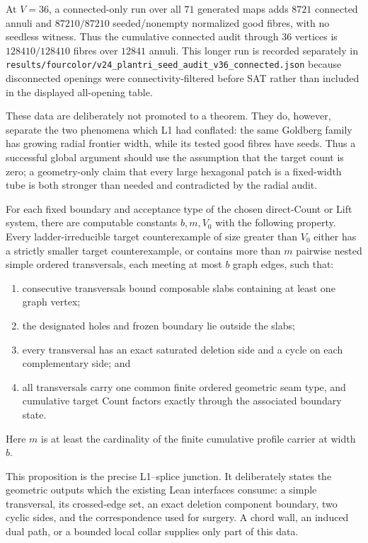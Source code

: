 At $V=36$, a connected-only run over all $71$ generated maps adds
$8721$ connected annuli and $87210/87210$ seeded/nonempty normalized
good fibres, with no seedless witness.  Thus the cumulative connected audit
through $36$ vertices is $128410/128410$ fibres over $12841$ annuli.
This longer run is recorded separately in
\texttt{results/fourcolor/v24\_plantri\_seed\_audit\_v36\_connected.json}
because disconnected openings were connectivity-filtered before SAT rather
than included in the displayed all-opening table.

These data are deliberately not promoted to a theorem.  They do, however,
separate the two phenomena which L1 had conflated: the same Goldberg family
has growing radial frontier width, while its tested good fibres have seeds.
Thus a successful global argument should use the assumption that the target
count is zero; a geometry-only claim that every large hexagonal patch is a
fixed-width tube is both stronger than needed and contradicted by the radial
audit.

\begin{proposition}
\label{prop:target-forced-cut-chain}
\Sopen
For each fixed boundary and acceptance type of the chosen direct-Count or
Lift system, there are computable constants \(b,m,V_0\) with the
following property.  Every ladder-irreducible target counterexample of size
greater than \(V_0\) either has a strictly smaller target counterexample, or
contains more than \(m\) pairwise nested simple ordered transversals, each
meeting at most \(b\) graph edges, such that:
\begin{enumerate}
\item consecutive transversals bound composable slabs containing at least one
graph vertex;
\item the designated holes and frozen boundary lie outside the slabs;
\item every transversal has an exact saturated deletion side and a cycle on
each complementary side; and
\item all transversals carry one common finite ordered geometric seam type,
and cumulative target Count factors exactly through the associated boundary
state.
\end{enumerate}
Here \(m\) is at least the cardinality of the finite cumulative profile
carrier at width \(b\).
\end{proposition}

This proposition is the precise L1--splice junction.  It deliberately states
the geometric outputs which the existing Lean interfaces consume: a simple
transversal, its crossed-edge set, an exact deletion component boundary, two
cyclic sides, and the correspondence used for surgery.  A chord wall, an
induced dual path, or a bounded local collar supplies only part of this data.

